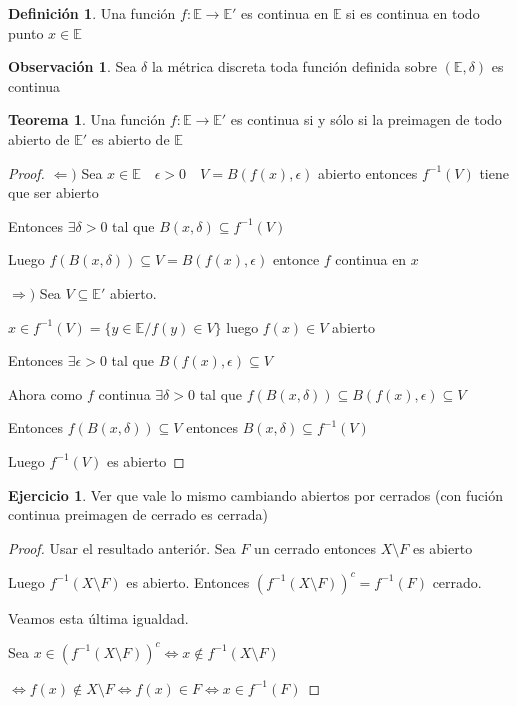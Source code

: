 \documentclass[12pt]{article}
\newcommand{\E}{\mathbb{E}}
\newcommand{\Ra}{\Rightarrow}
\newcommand{\ra}{\rightarrow}
\theoremstyle{definition}
\newtheorem{definition}{Definición}[section]
\newtheorem*{remark}{Observación}
\newtheorem{theorem}{Teorema}
\newtheorem{ej}{Ejercicio}
\begin{document}
\begin{definition}
Una función $f: \E \ra \E '$ es continua en $\E$ si es continua en todo punto $x \in \E$  
\end{definition}
\begin{remark}
  Sea $\delta$ la métrica discreta toda función definida sobre $(\E,\delta)$ es continua
\end{remark}
\begin{theorem}
  Una función $f:\E \ra \E '$ es continua si y sólo si la preimagen de todo abierto de $\E '$ es abierto de $\E$
  \begin{proof}
  $\Leftarrow )$ Sea $x \in \E \quad \epsilon >0 \quad V = B(f(x),\epsilon)$ abierto entonces $f^{-1}(V)$ tiene que ser abierto

  Entonces $\exists \delta > 0$ tal que $B(x,\delta )\subseteq f^{-1}(V)$

  Luego $f(B(x,\delta))\subseteq V = B(f(x),\epsilon)$ entonce $f$ continua en $x$

$\Ra )$ Sea $V \subseteq \E '$ abierto.

$x \in f^{-1}(V) = \{y \in \E / f(y) \in V\}$ luego $f(x) \in V$ abierto 

Entonces $\exists \epsilon > 0 $ tal que $B(f(x),\epsilon) \subseteq V$

Ahora como $f $ continua $\exists \delta > 0$ tal que $f(B(x,\delta)) \subseteq B(f(x),\epsilon) \subseteq V$

Entonces $f(B(x,\delta))\subseteq V$ entonces $B(x,\delta) \subseteq f^{-1}(V)$

Luego $f^{-1}(V)$ es abierto

 \end{proof}
\end{theorem}
\begin{ej}
  Ver que vale lo mismo cambiando abiertos por cerrados (con fución continua preimagen de cerrado es cerrada)
\begin{proof}
  Usar el resultado anteriór. Sea $F$ un cerrado entonces $X \setminus F$ es abierto

Luego $f^{-1}(X \setminus F)$ es abierto. Entonces $(f^{-1}(X \setminus F))^c = f^{-1}(F)$ cerrado.

Veamos esta última igualdad. 

Sea $x \in (f^{-1}(X \setminus F))^c \iff x \notin f^{-1}(X \setminus F)$ 

$\iff f(x) \notin X \setminus F \iff f(x) \in F\iff x \in f^{-1}(F)$

\end{proof}
\end{ej}
\end{document}
